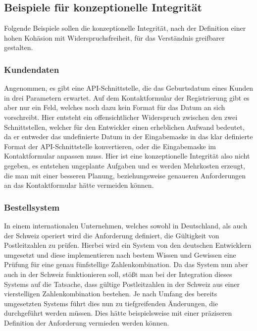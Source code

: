 \documentclass[a4paper, ngerman, 12pt, usenames, dvipsnames]{article}
\begin{document}
\subsection{Beispiele für konzeptionelle Integrität}
Folgende Beispiele sollen die konzeptionelle Integrität, nach der Definition einer hohen Kohäsion mit Widerspruchsfreiheit, für das Verständnis greifbarer gestalten.

\subsubsection{Kundendaten}
Angenommen, es gibt eine API-Schnittstelle, die das Geburtsdatum eines Kunden in drei Parametern erwartet. Auf dem Kontaktformular der Registrierung gibt es aber nur ein Feld, welches noch dazu kein Format für das Datum an sich vorschreibt. Hier entsteht ein offensichtlicher Widerspruch zwischen den zwei Schnittstellen, welcher für den Entwickler einen erheblichen Aufwand bedeutet, da er entweder das undefinierte Datum in der Eingabemaske in das klar definierte Format der API-Schnittstelle konvertieren, oder die Eingabemaske im Kontaktformular anpassen muss. Hier ist eine konzeptionelle Integrität also nicht gegeben, es entstehen ungeplante Aufgaben und es werden Mehrkosten erzeugt, die man mit einer besseren Planung, beziehungsweise genaueren Anforderungen an das Kontaktformular hätte vermeiden können.

\subsubsection{Bestellsystem}
In einem internationalen Unternehmen, welches sowohl in Deutschland, als auch der Schweiz operiert wird die Anforderung definiert, die Gültigkeit von Postleitzahlen zu prüfen. Hierbei wird ein System von den deutschen Entwicklern umgesetzt und diese implementieren nach bestem Wissen und Gewissen eine Prüfung für eine genau fünfstellige Zahlenkombination. Da das System nun aber auch in der Schweiz funktionieren soll, stößt man bei der Integration dieses Systems auf die Tatsache, dass gültige Postleitzahlen in der Schweiz aus einer vierstelligen Zahlenkombination bestehen. Je nach Umfang des bereits umgesetzten Systems führt dies nun zu tiefgreifenden Änderungen, die durchgeführt werden müssen. Dies hätte beispielsweise mit einer präziseren Definition der Anforderung vermieden werden können.
\pagebreak
\end{document}
